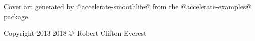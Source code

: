 \markboth{}{}
\pagebreak
{}

\begin{small}
Cover art generated by @accelerate-smoothlife@ from the @accelerate-examples@ package.

\vspace{3ex}

Copyright 2013-2018 \copyright\ Robert Clifton-Everest
\end{small}